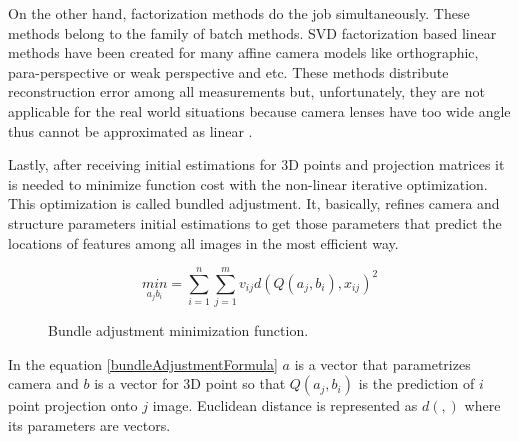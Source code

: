 \documentclass[../../../../main]{subfiles}
\begin{document}
On the other hand, factorization methods do the job simultaneously. These methods belong to the family of batch methods. \ac{SVD} factorization based linear methods have been created for many affine camera models like orthographic, para-perspective or weak perspective and etc. These methods distribute reconstruction error among all measurements but, unfortunately, they are not applicable for the real world situations because camera lenses have too wide angle thus cannot be approximated as linear \cite{factorization_sfm}.

Lastly, after receiving initial estimations for 3D points and projection matrices it is needed to minimize function cost with the non-linear iterative optimization. This optimization is called bundled adjustment. It, basically, refines camera and structure parameters initial estimations to get those parameters that predict the locations of features among all images in the most efficient way.

\begin{figure} [!ht]
  \centering    
    \begin{equation}
        \underset{a_j b_i}{min} = \sum_{i=1}^{n} \sum_{j=1}^{m} v_{i j} d(Q(a_j, b_i), x_{i j})^2
        \label{bundleAdjustmentFormula}
    \end{equation}
  \caption{Bundle adjustment minimization function.}
\end{figure}

In the equation \ref{bundleAdjustmentFormula} $a$ is a vector that parametrizes camera and $b$ is a vector for 3D point so that $Q(a_j, b_i)$ is the prediction of $i$ point projection onto $j$ image. Euclidean distance is represented as $d(,)$ where its parameters are vectors.
\end{document}
